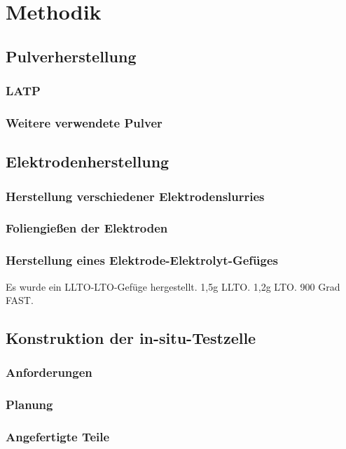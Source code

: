 \documentclass[a4paper, 11pt, headsepline,footsepline,twoside,abstract]{scrbook}
\begin{document}
\chapter{Methodik}
\section{Pulverherstellung}
\subsection{LATP}
\subsection{}
\subsection{Weitere verwendete Pulver}
\section{Elektrodenherstellung}
\subsection{Herstellung verschiedener Elektrodenslurries}
\subsection{Foliengießen der Elektroden}
\subsection{Herstellung eines Elektrode-Elektrolyt-Gefüges}
Es wurde ein LLTO-LTO-Gefüge hergestellt. 1,5g LLTO. 1,2g LTO. 900 Grad FAST.
\section{Konstruktion der in-situ-Testzelle}
\subsection{Anforderungen}
\subsection{Planung}
\subsection{Angefertigte Teile}
\end{document}
